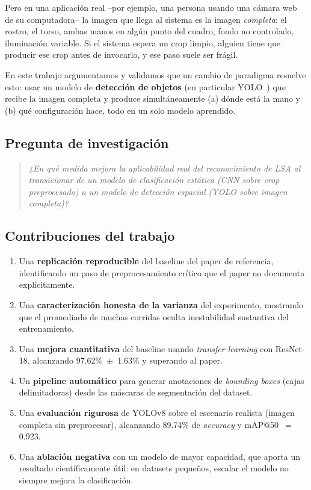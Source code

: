 \documentclass[a4paper,11pt]{article}
\begin{document}
Pero en una aplicación real --por ejemplo, una persona usando una cámara web de su computadora-- la imagen que llega al sistema es la imagen \emph{completa}: el rostro, el torso, ambas manos en algún punto del cuadro, fondo no controlado, iluminación variable. Si el sistema espera un crop limpio, alguien tiene que producir ese crop antes de invocarlo, y ese paso suele ser frágil.

En este trabajo argumentamos y validamos que un cambio de paradigma resuelve esto: usar un modelo de \textbf{detección de objetos} (en particular YOLO~\cite{redmon2016yolo}) que recibe la imagen completa y produce simultáneamente (a) dónde está la mano y (b) qué configuración hace, todo en un solo modelo aprendido.

\subsection{Pregunta de investigación}

\begin{quote}
\textit{¿En qué medida mejora la aplicabilidad real del reconocimiento de LSA al transicionar de un modelo de clasificación estática (CNN sobre crop preprocesado) a un modelo de detección espacial (YOLO sobre imagen completa)?}
\end{quote}

\subsection{Contribuciones del trabajo}

\begin{enumerate}[itemsep=2pt]
    \item Una \textbf{replicación reproducible} del baseline del paper de referencia, identificando un paso de preprocesamiento crítico que el paper no documenta explícitamente.
    \item Una \textbf{caracterización honesta de la varianza} del experimento, mostrando que el promediado de muchas corridas oculta inestabilidad sustantiva del entrenamiento.
    \item Una \textbf{mejora cuantitativa} del baseline usando \textit{transfer learning} con ResNet-18, alcanzando 97.62\%~$\pm$~1.63\% y superando al paper.
    \item Un \textbf{pipeline automático} para generar anotaciones de \textit{bounding boxes} (cajas delimitadoras) desde las máscaras de segmentación del dataset.
    \item Una \textbf{evaluación rigurosa} de YOLOv8 sobre el escenario realista (imagen completa sin preprocesar), alcanzando 89.74\% de \textit{accuracy} y mAP@50~$=~$0.923.
    \item Una \textbf{ablación negativa} con un modelo de mayor capacidad, que aporta un resultado científicamente útil: en datasets pequeños, escalar el modelo no siempre mejora la clasificación.
\end{enumerate}
\end{document}
